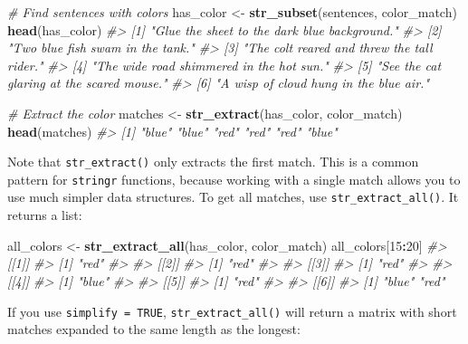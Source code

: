 \documentclass[
]{book}
\newenvironment{Shaded}{\begin{snugshade}}{\end{snugshade}}
\newcommand{\CommentTok}[1]{\textcolor[rgb]{0.56,0.35,0.01}{\textit{#1}}}
\newcommand{\DecValTok}[1]{\textcolor[rgb]{0.00,0.00,0.81}{#1}}
\newcommand{\KeywordTok}[1]{\textcolor[rgb]{0.13,0.29,0.53}{\textbf{#1}}}
\newcommand{\NormalTok}[1]{#1}
\newcommand{\OperatorTok}[1]{\textcolor[rgb]{0.81,0.36,0.00}{\textbf{#1}}}
\newcommand{\StringTok}[1]{\textcolor[rgb]{0.31,0.60,0.02}{#1}}
\begin{document}
\begin{Shaded}
\begin{Highlighting}[]
\CommentTok{# Find sentences with colors}
\NormalTok{has_color <-}\StringTok{ }\KeywordTok{str_subset}\NormalTok{(sentences, color_match)}
\KeywordTok{head}\NormalTok{(has_color)}
\CommentTok{#> [1] "Glue the sheet to the dark blue background."}
\CommentTok{#> [2] "Two blue fish swam in the tank."            }
\CommentTok{#> [3] "The colt reared and threw the tall rider."  }
\CommentTok{#> [4] "The wide road shimmered in the hot sun."    }
\CommentTok{#> [5] "See the cat glaring at the scared mouse."   }
\CommentTok{#> [6] "A wisp of cloud hung in the blue air."}

\CommentTok{# Extract the color}
\NormalTok{matches <-}\StringTok{ }\KeywordTok{str_extract}\NormalTok{(has_color, color_match)}
\KeywordTok{head}\NormalTok{(matches)}
\CommentTok{#> [1] "blue" "blue" "red"  "red"  "red"  "blue"}
\end{Highlighting}
\end{Shaded}

Note that \texttt{str\_extract()} only extracts the first match. This is a common pattern for \texttt{stringr} functions, because working with a single match allows you to use much simpler data structures. To get all matches, use \texttt{str\_extract\_all()}. It returns a list:

\begin{Shaded}
\begin{Highlighting}[]
\NormalTok{all_colors <-}\StringTok{ }\KeywordTok{str_extract_all}\NormalTok{(has_color, color_match)}
\NormalTok{all_colors[}\DecValTok{15}\OperatorTok{:}\DecValTok{20}\NormalTok{]}
\CommentTok{#> [[1]]}
\CommentTok{#> [1] "red"}
\CommentTok{#> }
\CommentTok{#> [[2]]}
\CommentTok{#> [1] "red"}
\CommentTok{#> }
\CommentTok{#> [[3]]}
\CommentTok{#> [1] "red"}
\CommentTok{#> }
\CommentTok{#> [[4]]}
\CommentTok{#> [1] "blue"}
\CommentTok{#> }
\CommentTok{#> [[5]]}
\CommentTok{#> [1] "red"}
\CommentTok{#> }
\CommentTok{#> [[6]]}
\CommentTok{#> [1] "blue" "red"}
\end{Highlighting}
\end{Shaded}

If you use \texttt{simplify\ =\ TRUE}, \texttt{str\_extract\_all()} will return a matrix with short matches expanded to the same length as the longest:
\end{document}
